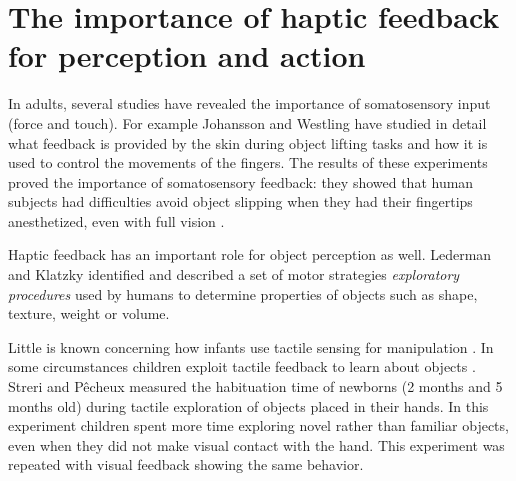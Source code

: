 \section{The importance of haptic feedback for perception and action}
\label{sec:background}

In adults, several studies have revealed the importance of
somatosensory input (force and touch). For example Johansson and Westling
\cite{Johansson90Tactile} have studied in detail what feedback
is provided by the skin during object lifting tasks and how it is
used to control the movements of the fingers. The results of these
experiments proved the importance of somatosensory feedback: they
showed that human subjects had difficulties avoid object slipping when
they had their fingertips anesthetized, even with full vision
\cite{johansson91how}. 

Haptic feedback has an important role for
object perception as well. Lederman and Klatzky \cite{klatzky87Hand}
identified and described a set of motor strategies
\emph{exploratory procedures} used by humans to determine properties
of objects such as shape, texture, weight or volume.

Little is known concerning how infants use 
tactile sensing for manipulation \cite{streri93Seeing}.
In some circumstances children exploit tactile feedback to learn
about objects \cite{streri86Habituation}. Streri and P\^{e}cheux
measured the habituation time of newborns (2 months and 5 months
old) during tactile exploration of objects placed in their hands.
In this experiment children spent more time exploring novel rather
than familiar objects, even when they did not make visual contact
with the hand. This experiment was repeated with visual feedback
showing the same behavior.

